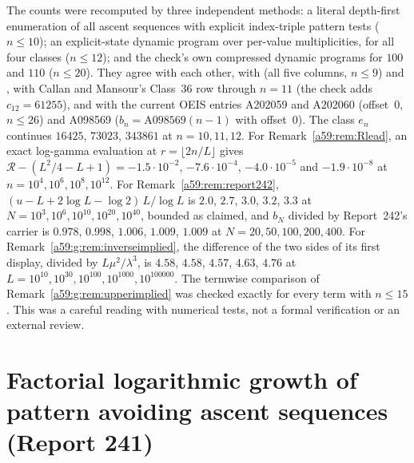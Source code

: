 \documentclass[11pt,letterpaper]{article}
\newcommand{\PartMark}[1]{\InsertMark{a59part}{#1}}
\theoremstyle{remark}\newtheorem{remark}[theorem]{Remark}
\theoremstyle{remark}\newtheorem{wremark}{Remark}\renewcommand{\thewremark}{W\arabic{wremark}}
\theoremstyle{plain}\newtheorem{wcorollary}[wremark]{Corollary}
\begin{document}
The counts were recomputed by three independent methods: a literal
depth-first enumeration of all ascent sequences with explicit index-triple
pattern tests ($n\le10$); an explicit-state dynamic program over
per-value multiplicities, for all four classes ($n\le12$); and the check's
own compressed dynamic programs for $100$ and $110$ ($n\le20$). They agree
with each other, with  (all five columns,
$n\le9$) and , with Callan and
Mansour's Class~36 row through $n=11$ (the check adds $c_{12}=61255$), and
with the current OEIS entries A202059 and A202060 (offset~$0$, $n\le26$) and
A098569 ($b_n=\mathrm{A098569}(n-1)$ with offset~$0$). The class $e_n$
continues $16425$, $73023$, $343861$ at $n=10,11,12$. For
Remark~\ref{a59:rem:Rlead}, an exact log-gamma evaluation at
$r=\lfloor2n/L\rfloor$ gives $\mathcal R-(L^2/4-L+1)=-1.5\cdot10^{-2}$,
$-7.6\cdot10^{-4}$, $-4.0\cdot10^{-5}$ and $-1.9\cdot10^{-8}$ at
$n=10^4,10^6,10^8,10^{12}$. For Remark~\ref{a59:rem:report242},
$(u-L+2\log L-\log2)\,L/\log L$ is $2.0$, $2.7$, $3.0$, $3.2$, $3.3$ at
$N=10^3,10^6,10^{10},10^{20},10^{40}$, bounded as claimed, and $b_N$ divided
by Report~242's carrier is $0.978$, $0.998$, $1.006$, $1.009$, $1.009$ at
$N=20,50,100,200,400$. For Remark~\ref{a59:g:rem:inverseimplied}, the
difference of the two sides of its first display, divided by
$L\mu^2/\lambda^3$, is $4.58$, $4.58$, $4.57$, $4.63$, $4.76$ at
$L=10^{10},10^{30},10^{100},10^{1000},10^{100000}$. The termwise comparison
of Remark~\ref{a59:g:rem:upperimplied} was checked exactly for every term
with $n\le15$. This was a careful reading with numerical tests, not a formal
verification or an external review.

\part{Factorial logarithmic growth of pattern avoiding ascent sequences (Report 241)}\label{a59:g:part}
\PartMark{Part II: Report 241}
\end{document}
